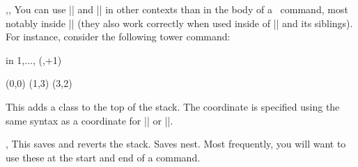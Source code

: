 \begin{sseqdata}[name = basic, cohomological Serre grading]
\begin{commandlist}{\lastx{},\lasty{},\lastclass{}}
You can use |\lastx| and |\lasty| in other contexts than in the body of a \sseqpages\ command, most notably inside |\SseqParseInt| (they also work correctly when used inside of |\pgfmathparse| and its siblings). For instance, consider the following tower command:
\begin{codeexample}[width=6cm]
\DeclareSseqCommand \tower { } {
    \savestack
    \SseqParseInt{}
    \foreach \n in {1,...,\numclasses}{
        \class(\lastx,\lasty+1)
        \structline
    }
    \restorestack
}
\begin{sseqpage}[y range = {0}{5}]
\class(0,0)\tower
\class(1,3)\tower
\class(3,2)\tower
\end{sseqpage}
\end{codeexample}
\end{commandlist}


\begin{command}{\pushstack{}}
This adds a class to the top of the stack. The coordinate is specified using the same syntax as a coordinate for |\structline| or |\replaceclass|.
\end{command}

\begin{commandlist}{\savestack,\restorestack}
This saves and reverts the stack. Saves nest. Most frequently, you will want to use these at the start and end of a command.
\end{commandlist}



\end{sseqdata}
